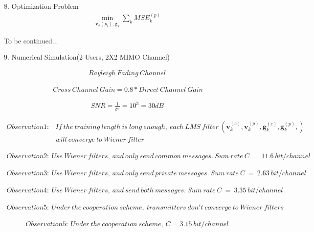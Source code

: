 \documentclass[11pt, oneside]{article}   	%
\begin{document}
8. Optimization Problem
\begin{align*}
\min_{\textbf{v}_{k}(p_{i}) ,\textbf{g}_{k}} \displaystyle\sum_{k} MSE^{(p)}_{k}
\end{align*}

To be continued...

\newpage

9. Numerical Simulation(2 Users, 2X2 MIMO Channel)


\begin{align*}
Rayleigh\ Fading\ Channel
\end{align*}

\begin{align*}
\ Cross\ Channel\ Gain = 0.8*Direct\ Channel\ Gain
\end{align*}

\begin{align*}
SNR = \frac {1}{\sigma^2} = 10^3=30dB
\end{align*}

\begin{align*}
Observation1: &If\ the\ training\ length\ is\ long\ enough,\ each\ LMS\ filter\ (\textbf{v}^{(c)}_{k},\textbf{v}^{(p)}_{k},\textbf{g}^{(c)}_{k},\textbf{g}^{(p)}_{k},)\\
&will\ converge\ to\ Wiener\ filter
\end{align*}

\begin{align*}
Observation2:\ Use\ Wiener\ filters,\ and\ only\ send\ common\ messages.\ Sum\ rate\ C\ =\ 11.6\ bit/channel
\end{align*}

\begin{align*}
Observation3:\ Use\ Wiener\ filters,\ and\ only\ send\ private\ messages.\ Sum\ rate\ C\ =\ 2.63\ bit/channel
\end{align*}

\begin{align*}
Observation4:\ Use\ Wiener\ filters,\ and\  send\ both\ messages.\ Sum\ rate\ C\ =\ 3.35\ bit/channel
\end{align*}

\begin{align*}
Observation5:\ Under\ the\ cooperation\ scheme,\ transmitters\ don't\ converge\ to\ Wiener\ filters 
\end{align*}

\begin{align*}
Observation5:\ Under\ the\ cooperation\ scheme,\ C=3.15\ bit/channel
\end{align*}
\end{document}
